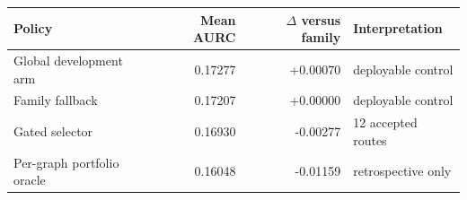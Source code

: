 \begin{tabular}{@{}lrrl@{}}
\toprule
Policy & Mean AURC & $\Delta$ versus family & Interpretation \\
\midrule
Global development arm & 0.17277 & +0.00070 & deployable control \\
Family fallback & 0.17207 & +0.00000 & deployable control \\
Gated selector & 0.16930 & -0.00277 & 12 accepted routes \\
Per-graph portfolio oracle & 0.16048 & -0.01159 & retrospective only \\
\bottomrule
\end{tabular}
